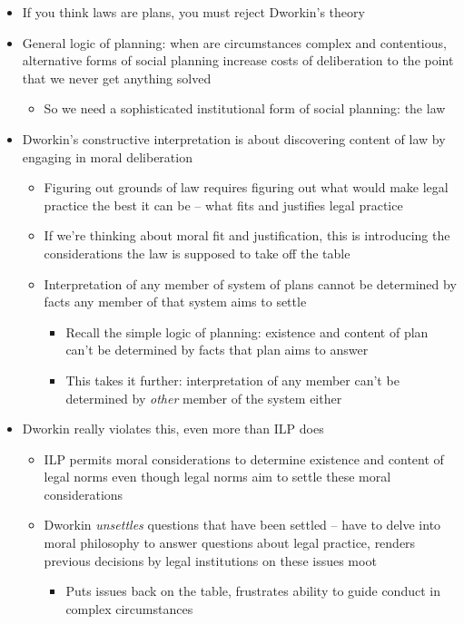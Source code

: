 \begin{itemize}
\tightlist
\item
  If you think laws are plans, you must reject Dworkin's theory
\item
  General logic of planning: when are circumstances complex and
  contentious, alternative forms of social planning increase costs of
  deliberation to the point that we never get anything solved

  \begin{itemize}
  \tightlist
  \item
    So we need a sophisticated institutional form of social planning:
    the law
  \end{itemize}
\item
  Dworkin's constructive interpretation is about discovering content of
  law by engaging in moral deliberation

  \begin{itemize}
  \tightlist
  \item
    Figuring out grounds of law requires figuring out what would make
    legal practice the best it can be -- what fits and justifies legal
    practice
  \item
    If we're thinking about moral fit and justification, this is
    introducing the considerations the law is supposed to take off the
    table
  \item
    Interpretation of any member of system of plans cannot be determined
    by facts any member of that system aims to settle

    \begin{itemize}
    \tightlist
    \item
      Recall the simple logic of planning: existence and content of plan
      can't be determined by facts that plan aims to answer
    \item
      This takes it further: interpretation of any member can't be
      determined by \emph{other} member of the system either
    \end{itemize}
  \end{itemize}
\item
  Dworkin really violates this, even more than ILP does

  \begin{itemize}
  \tightlist
  \item
    ILP permits moral considerations to determine existence and content
    of legal norms even though legal norms aim to settle these moral
    considerations
  \item
    Dworkin \emph{unsettles} questions that have been settled -- have to
    delve into moral philosophy to answer questions about legal
    practice, renders previous decisions by legal institutions on these
    issues moot

    \begin{itemize}
    \tightlist
    \item
      Puts issues back on the table, frustrates ability to guide conduct
      in complex circumstances
    \end{itemize}
  \end{itemize}
\end{itemize}

